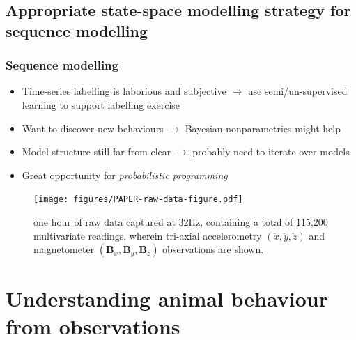 \documentclass[aspectratio=169]{beamer}
\begin{document}
\begin{frame}
    \subsection{Appropriate state-space modelling strategy for sequence modelling}

    \frametitle{Sequence modelling}
    \begin{itemize}
        \item Time-series labelling is laborious and subjective $\rightarrow$ use semi/un-supervised learning to support labelling exercise
        \item Want to discover new behaviours $\rightarrow$ Bayesian nonparametrics might help 
        \item Model structure still far from clear $\rightarrow$ probably need to iterate over models 
        \item Great opportunity for \emph{probabilistic programming}
    \end{itemize}
    \vspace{-1em}
    \begin{figure}
        \centering
        \texttt{[image: figures/PAPER-raw-data-figure.pdf]}
        \vspace{-0.5em}
    \caption{one hour of raw data captured at 32Hz, containing a total of 115,200 multivariate readings, wherein tri-axial accelerometry $(\ddot{x},\ddot{y},\ddot{z})$ and magnetometer $(\mathbf{B}_x,\mathbf{B}_y,\mathbf{B}_z)$ observations are shown.}
    \end{figure}
    

\end{frame}

\section{Understanding animal behaviour from observations} 
\end{document}
